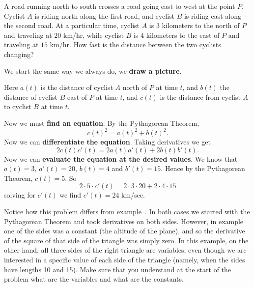 \begin{example}
A road running north to south crosses a road going east to west at the
point $P$.  Cyclist $A$ is riding north along the first road, and cyclist $B$ is
riding east along the second road.  At a particular time, cyclist $A$ is $3$
kilometers to the north of $P$ and traveling at $20$ km/hr, while cyclist
$B$ is $4$ kilometers to the east of $P$ and traveling at $15$ km/hr.
How fast is the distance between the two cyclists changing?
\end{example}

\begin{solution}
We start the same way we always do, we \textbf{draw a picture}.


Here $a(t)$ is the distance of cyclist $A$ north of $P$ at time $t$,
and $b(t)$ the distance of cyclist $B$ east of $P$ at time $t$, and
$c(t)$ is the distance from cyclist $A$ to cyclist $B$ at time $t$.

Now we must \textbf{find an equation}.  By the Pythagorean Theorem,
\[
c(t)^2=a(t)^2+b(t)^2.
\] 
Now we can \textbf{differentiate the equation}. Taking derivatives we get 
\[
2c(t)c'(t)=2a(t)a'(t)+2b(t)b'(t).
\]
Now we can  \textbf{evaluate the equation at the desired values}.
We know that $a(t) = 3$, $a'(t) = 20$, $b(t) = 4$ and $b'(t) = 15$. Hence 
by the Pythagorean Theorem, $c(t) = 5$. So 
\[
2\cdot 5 \cdot c'(t) = 2 \cdot 3\cdot 20 + 2 \cdot 4 \cdot 15
\]
solving for $c'(t)$ we find $c'(t) = 24$ km/sec.
\end{solution}



Notice how this problem differs from example~.  In both cases we started with the Pythagorean Theorem and
took derivatives on both sides.  However, in
example~ one of the sides was a constant
(the altitude of the plane), and so the derivative of the square of
that side of the triangle was simply zero.  In this example, on the
other hand, all three sides of the right triangle are variables, even
though we are interested in a specific value of each side of the
triangle (namely, when the sides have lengths 10 and 15). Make sure that
you understand at the start of the problem what are the variables and
what are the constants.



